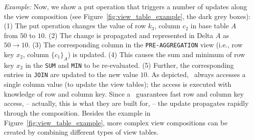%
%
\textit{Example:} Now, we show a put operation that triggers a number
of updates along the view composition (see
Figure~\ref{fig:view_table_example}, the dark grey boxes): (1) The put
operation changes the value of row $k_3$, column $c_2$ in base table
$A$ from $50$ to $10$. (2) The change is propagated and represented in
Delta $A$ as $50\rightarrow 10$. (3) The corresponding column in the
\texttt{PRE-AGGREGATION} view (i.e., row key $x_2$, column
$\{c_1\}_A$) is updated. (4) This causes the sum and minimum of row
key $x_2$ in the \texttt{SUM} and \texttt{MIN} to be re-evaluated. (5)
Further, the corresponding entries in \texttt{JOIN} are updated to the
new value $10$. As depicted, \VMS\ always accesses a single column
value (to update the view tables); the access is executed with
knowledge of row and column key. Since a \KVS\ guarantees fast row and
column key access, -- actually, this is what they are built for, --
the update propagates rapidly through the composition.  Besides the
example in Figure~\ref{fig:view_table_example}, more complex view
compositions can be created by combining different types of view
tables.

%
%








 








